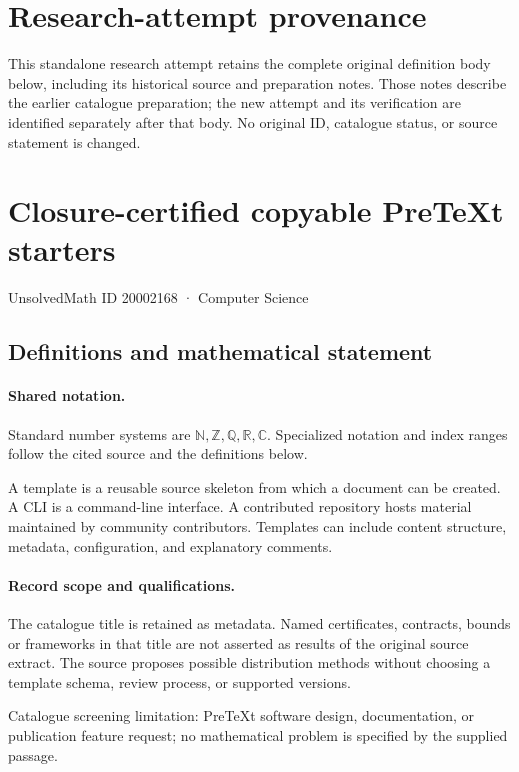 \documentclass[11pt]{article}
\begin{document}
\section*{Research-attempt provenance}
This standalone research attempt retains the complete original definition body below,
including its historical source and preparation notes. Those notes describe the
earlier catalogue preparation; the new attempt and its verification are identified
separately after that body. No original ID, catalogue status, or source statement is changed.

\section{Closure-certified copyable PreTeXt starters}\label{20002168}
{\small UnsolvedMath ID 20002168 · Computer Science}
\subsection{Definitions and mathematical statement}

\paragraph{Shared notation.}Standard number systems are $\mathbb N,\mathbb Z,\mathbb Q,\mathbb R,\mathbb C$. Specialized notation and index ranges follow the cited source and the definitions below.


A template is a reusable source skeleton from which a document can be created. A CLI is a command-line interface. A contributed repository hosts material maintained by community contributors. Templates can include content structure, metadata, configuration, and explanatory comments.
\paragraph{Record scope and qualifications.}
The catalogue title is retained as metadata. Named certificates, contracts, bounds or frameworks in that title are not asserted as results of the original source extract.
The source proposes possible distribution methods without choosing a template schema, review process, or supported versions.

Catalogue screening limitation: PreTeXt software design, documentation, or publication feature request; no mathematical problem is specified by the supplied passage.
\end{document}

